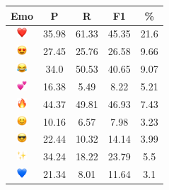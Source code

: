 \documentclass{article}
\begin{document}
\begin{table}
\centering
\begin{tabular}{|c|ccc|c|} \hline
\textbf{Emo} & \textbf{P} & \textbf{R} & \textbf{F1} & \textbf{\%} \\ \hline
\includegraphics[height=0.37cm,width=0.37cm]{img/red_heart.png} & 35.98 & 61.33 & 45.35 & 21.6\\ 
\includegraphics[height=0.37cm,width=0.37cm]{img/smiling_face_with_hearteyes.png} & 27.45 & 25.76 & 26.58 & 9.66\\ 
\includegraphics[height=0.37cm,width=0.37cm]{img/face_with_tears_of_joy.png} & 34.0 & 50.53 & 40.65 & 9.07\\ 
\includegraphics[height=0.37cm,width=0.37cm]{img/two_hearts.png} & 16.38 & 5.49 & 8.22 & 5.21\\ 
\includegraphics[height=0.37cm,width=0.37cm]{img/fire.png} & 44.37 & 49.81 & 46.93 & 7.43\\ 
\includegraphics[height=0.37cm,width=0.37cm]{img/smiling_face_with_smiling_eyes.png} & 10.16 & 6.57 & 7.98 & 3.23\\ 
\includegraphics[height=0.37cm,width=0.37cm]{img/smiling_face_with_sunglasses.png} & 22.44 & 10.32 & 14.14 & 3.99\\ 
\includegraphics[height=0.37cm,width=0.37cm]{img/sparkles.png} & 34.24 & 18.22 & 23.79 & 5.5\\ 
\includegraphics[height=0.37cm,width=0.37cm]{img/blue_heart.png} & 21.34 & 8.01 & 11.64 & 3.1\\ 

\end{tabular}
\end{table}
\end{document}
